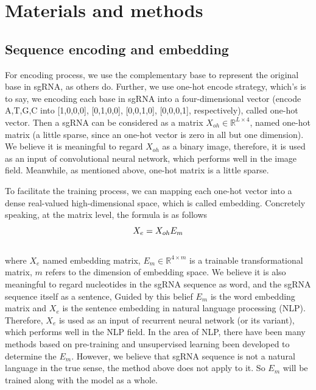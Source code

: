\documentclass{bioinfo}
\begin{document}
\section{Materials and methods}

\subsection{Sequence encoding and embedding}

For encoding process, we use the complementary base to represent the original base in sgRNA, as others do. 
Further, we use one-hot encode strategy, which's is to say, we encoding each base in sgRNA into a four-dimensional vector 
(encode A,T,G,C into [1,0,0,0], [0,1,0,0], [0,0,1,0], [0,0,0,1], respectively), called one-hot vector. 
Then a sgRNA can be considered as a matrix $X_{oh}\in\mathbb{R}^{L\times 4} $, named one-hot matrix (a little sparse, since an one-hot vector is zero in all but one dimension). 
We believe it is meaningful to regard $X_{oh}$ as a binary image, 
therefore, it is used as an input of convolutional neural network, which performs well in the image field.
Meanwhile, as mentioned above, one-hot matrix is a little sparse. 

To facilitate the training process, we can mapping each one-hot vector into a dense real-valued high-dimensional space, which is called embedding. 
Concretely speaking, at the matrix level, the formula is as follows
\begin{equation}
X_e=X_{oh}E_m\label{eq:08}\vspace*{-10pt}
\end{equation}\\
where $X_e$ named embedding matrix, $E_m\in\mathbb{R}^{4\times m}$ is a trainable transformational matrix, $m$ refers to the dimension of embedding space. 
We believe it is also meaningful to regard nucleotides in the sgRNA sequence as word, and the sgRNA sequence itself as a sentence, 
Guided by this belief $E_m$ is the word embedding matrix and $X_e$ is the sentence embedding in natural language processing (NLP).
Therefore, $X_e$ is used as an input of recurrent neural network (or its variant), which performs well in the NLP field.
In the area of NLP, there have been many methods based on pre-training and unsupervised learning been developed to determine the $E_m$. 
However, we believe that sgRNA sequence is not a natural language in the true sense, the method above does not apply to it. 
So $E_m$ will be trained along with the model as a whole. 
\end{document}
